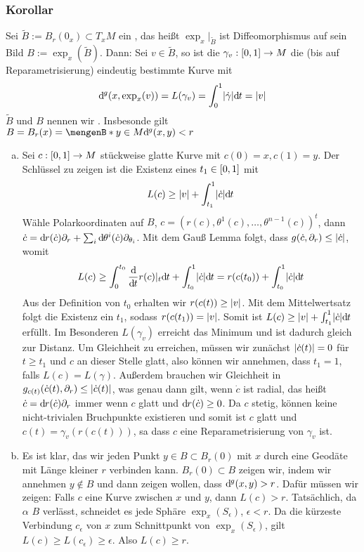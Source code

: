 \subsubsection{Korollar}
\label{ssub:250}
Sei $\tilde{B} := B_r(0_x)\subset T_x M$ ein , das heißt $\exp_x\vert_{\tilde{B}}$ ist Diffeomorphismus auf sein Bild $B:= \exp_x (\tilde{B})$. Dann: Sei $v\in \tilde{B}$, so ist die  $\gamma_v:[0,1]\to M$ die (bis auf Reparametrisierung) eindeutig bestimmte Kurve mit 
\[
\mathrm{d}\mkern-1.0mu^g(x,\exp_x(v)) = L(\gamma_v) = \int_0^1 \lvert\dot{\gamma}\rvert\mathrm{d}\mkern-1.0mu t = \lvert v\rvert
\]
$\tilde{B}$ und $B$ nennen wir . Insbesonde gilt $B = B_r(x) = \set[y\in M]{\mathd^g(x,y)<r}$
\begin{enumerate}[(a)]
\item Sei $c:[0,1]\to M$ stückweise glatte Kurve mit $c(0) = x, c(1) = y$. Der Schlüssel zu zeigen ist die Existenz eines $t_1\in [0,1]$ mit
\[
L(c) \geq \lvert v\rvert + \int_{t_1}^1 \lvert\dot{c}\rvert\mathrm{d}\mkern-1.0mu t 
\]
Wähle Polarkoordinaten auf $B$, $c=(r(c),\theta^1(c),\ldots,\theta^{n-1}(c))^t$, dann $\dot{c} = \mathrm{d}\mkern-1.0mu r(\dot{c})\partial_r + \sum_i \mathrm{d}\mkern-1.0mu \theta^i (\dot{c})\partial_{\theta_i}$. Mit dem Gauß Lemma folgt, dass $g(\dot{c},\partial_r) \leq \lvert\dot{c}\rvert$, womit
\[
L(c) \geq \int_0^{t_0} \frac{\mathrm{d}\mkern-1.0mu}{\mathrm{d}\mkern-1.0mu t} r(c)\vert_t \mathrm{d}\mkern-1.0mu t + \int_{t_0}^1 \lvert\dot{c}\rvert \mathrm{d}\mkern-1.0mu t = r(c(t_0)) + \int_{t_0}^1 \lvert\dot{c}\rvert \mathrm{d}\mkern-1.0mu t
\]
Aus der Definition von $t_0$ erhalten wir $r(c(t))\geq \lvert v\rvert$. Mit dem Mittelwertsatz folgt die Existenz ein $t_1$, sodass $r(c(t_1)) = \lvert v\rvert$. Somit ist $L(c) \geq \lvert v\rvert + \int_{t_1}^1 \lvert\dot{c}\rvert\mathrm{d}\mkern-1.0mu t$ erfüllt. Im Besonderen $L(\gamma_v)$ erreicht das Minimum und ist dadurch gleich zur Distanz. Um Gleichheit zu erreichen, müssen wir zunächst $\lvert\dot{c}(t)\rvert = 0$ für $t\geq t_1$ und $c$ an dieser Stelle glatt, also können wir annehmen, dass $t_1 = 1$, falls $L(c) = L(\gamma)$. Außerdem brauchen wir Gleichheit in $g_{c(t)}(\dot{c}(t),\partial_r) \leq \lvert\dot{c}(t)\rvert$, was genau dann gilt, wenn $\dot{c}$ ist radial, das heißt $\dot{c} = \mathrm{d}\mkern-1.0mu r(\dot{c})\partial_r$ immer wenn $c$ glatt und $\mathrm{d}\mkern-1.0mu r(\dot{c}) \geq 0$. Da $c$ stetig, können keine nicht-trivialen Bruchpunkte existieren und somit ist $c$ glatt und $c(t) = \gamma_v(r(c(t)))$, sa dass $c$ eine Reparametrisierung von $\gamma_v$ ist.
\item Es ist klar, das wir jeden Punkt $y\in B\subset B_r(0)$ mit $x$ durch eine Geodäte mit Länge kleiner $r$ verbinden kann. $B_r(0) \subset B$ zeigen wir, indem wir annehmen $y \not \in B$ und dann zeigen wollen, dass $\mathrm{d}\mkern-1.0mu^g(x,y) > r$. Dafür müssen wir zeigen: Falls $c$ eine Kurve zwischen $x$ und $y$, dann $L(c)>r$. Tatsächlich, da $\alpha$ $B$ verlässt, schneidet es jede Sphäre $\exp_x (S_\epsilon)$, $\epsilon<r$. Da die kürzeste Verbindung $c_\epsilon$ von $x$ zum Schnittpunkt von $\exp_x(S_\epsilon)$, gilt $L(c)\geq L(c_\epsilon) \geq \epsilon$. Also $L(c) \geq r$. 
\end{enumerate}

